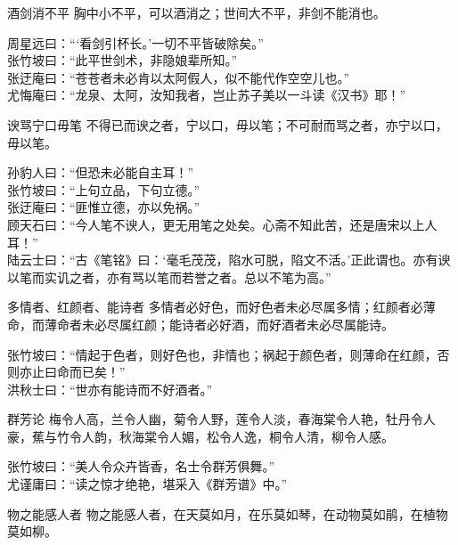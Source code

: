 \begin{yulu}{酒剑消不平}
胸中小不平，可以酒消之；世间大不平，非剑不能消也。
\begin{comments}
周星远曰：“‘看剑引杯长。’一切不平皆破除矣。” \\
张竹坡曰：“此平世剑术，非隐娘辈所知。” \\
张迂庵曰：“苍苍者未必肯以太阿假人，似不能代作空空儿也。” \\
尤悔庵曰：“龙泉、太阿，汝知我者，岂止苏子美以一斗读《汉书》耶！”
\end{comments}
\end{yulu}

\begin{yulu}{谀骂宁口毋笔}
不得已而谀之者，宁以口，毋以笔；不可耐而骂之者，亦宁以口，毋以笔。
\begin{comments}
孙豹人曰：“但恐未必能自主耳！” \\
张竹坡曰：“上句立品，下句立德。” \\
张迂庵曰：“匪惟立德，亦以免祸。” \\
顾天石曰：“今人笔不谀人，更无用笔之处矣。心斋不知此苦，还是唐宋以上人耳！” \\
陆云士曰：“古《笔铭》曰：‘毫毛茂茂，陷水可脱，陷文不活。’正此谓也。亦有谀以笔而实讥之者，亦有骂以笔而若誉之者。总以不笔为高。”
\end{comments}
\end{yulu}

\begin{yulu}{多情者、红颜者、能诗者}
多情者必好色，而好色者未必尽属多情；红颜者必薄命，而薄命者未必尽属红颜；能诗者必好酒，而好酒者未必尽属能诗。
\begin{comments}
张竹坡曰：“情起于色者，则好色也，非情也；祸起于颜色者，则薄命在红颜，否则亦止曰命而已矣！” \\
洪秋士曰：“世亦有能诗而不好酒者。”
\end{comments}
\end{yulu}

\begin{yulu}{群芳论}
梅令人高，兰令人幽，菊令人野，莲令人淡，春海棠令人艳，牡丹令人豪，蕉与竹令人韵，秋海棠令人媚，松令人逸，桐令人清，柳令人感。
\begin{comments}
张竹坡曰：“美人令众卉皆香，名士令群芳俱舞。” \\
尤谨庸曰：“读之惊才绝艳，堪采入《群芳谱》中。”
\end{comments}
\end{yulu}

\begin{yulu}{物之能感人者}
物之能感人者，在天莫如月，在乐莫如琴，在动物莫如鹃，在植物莫如柳。
\begin{comments}

\end{comments}
\end{yulu}

